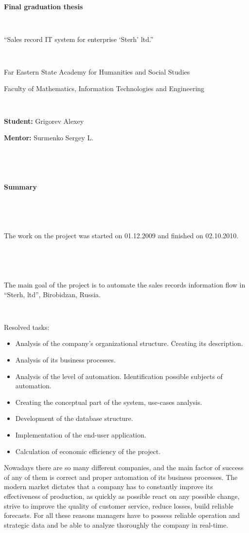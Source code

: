 \documentclass[a4paper, 12pt]{article}
\begin{document}
\begin{center}

{\large
\textbf{Final graduation thesis}

\

``Sales record IT system for enterprise `Sterh' ltd.''
}

\


Far Eastern State Academy for Humanities and Social Studies

Faculty of Mathematics, Information Technologies and Engineering

\

\textbf{Student:} Grigorev Alexey

\textbf{Mentor:} Surmenko Sergey L.

\

\

{\large\textbf{Summary}}

\end{center}

\

\

The work on the project was started on 01.12.2009 and finished on 02.10.2010.

\

\

The main goal of the project is to automate the sales records information flow in ``Sterh, ltd'', Birobidzan, Russia.

\


Resolved tasks:
\begin{itemize}
\item Analysis of the company's organizational structure. Creating its description.
\item Analysis of its business processes.
\item Analysis of the level of automation. Identification possible subjects of automation.
\item Creating the conceptual part of the system, use-cases analysis.
\item Development of the database structure.
\item Implementation of the end-user application.
\item Calculation of economic efficiency of the project.
\end{itemize}

\newpage

Nowadays there are so many different companies, and the main factor of success of any of them is correct and proper automation of its business processes. The modern market dictates that a company has to constantly improve its effectiveness of production, as quickly as possible react on any possible change, strive to improve the quality of customer service, reduce losses, build reliable forecasts. For all these reasons managers have to possess reliable operation and strategic data and be able to analyze thoroughly the company in real-time.
\end{document}
